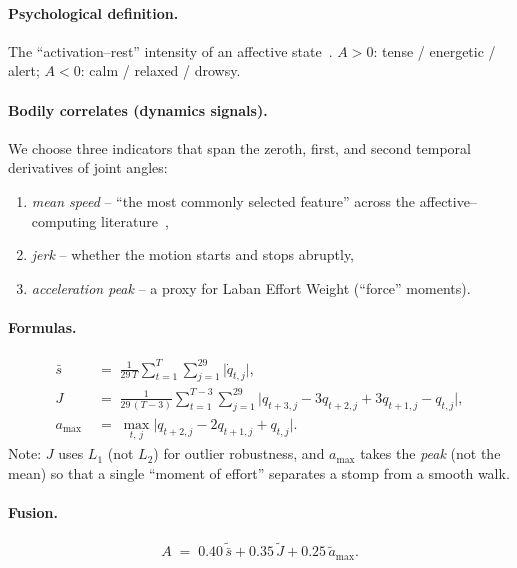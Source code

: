 \paragraph{Psychological definition.}
The ``activation--rest'' intensity of an affective
state~\cite{russell1980circumplex}. $A>0$: tense / energetic / alert;
$A<0$: calm / relaxed / drowsy.

\paragraph{Bodily correlates (dynamics signals).}
We choose three indicators that span the zeroth, first, and second
temporal derivatives of joint angles:
\begin{enumerate}\itemsep1pt
  \item \emph{mean speed} -- ``the most commonly selected feature''
        across the affective--computing literature~\cite{karg2013body},
  \item \emph{jerk} -- whether the motion starts and stops abruptly,
  \item \emph{acceleration peak} -- a proxy for Laban
        Effort\,\textperiodcentered\,Weight (``force'' moments).
\end{enumerate}

\paragraph{Formulas.}
\begin{align}
  \bar s    &\;=\; \frac{1}{29\,T}\sum_{t=1}^{T}\sum_{j=1}^{29}\bigl|\dot q_{t,j}\bigr|,
              \label{eq:A-speed}\\[2pt]
  J         &\;=\; \frac{1}{29\,(T-3)}\sum_{t=1}^{T-3}\sum_{j=1}^{29}
              \bigl|q_{t+3,j}-3q_{t+2,j}+3q_{t+1,j}-q_{t,j}\bigr|,
              \label{eq:A-jerk}\\[2pt]
  a_{\max}  &\;=\; \max_{t,\,j}\bigl|q_{t+2,j}-2q_{t+1,j}+q_{t,j}\bigr|.
              \label{eq:A-accmax}
\end{align}
Note: $J$ uses $L_1$ (not $L_2$) for outlier robustness, and $a_{\max}$
takes the \emph{peak} (not the mean) so that a single ``moment of effort''
separates a stomp from a smooth walk.

\paragraph{Fusion.}
\begin{equation}
  A \;=\; 0.40\,\tilde{\bar s} + 0.35\,\tilde J + 0.25\,\tilde a_{\max}.
  \label{eq:A-fuse}
\end{equation}

